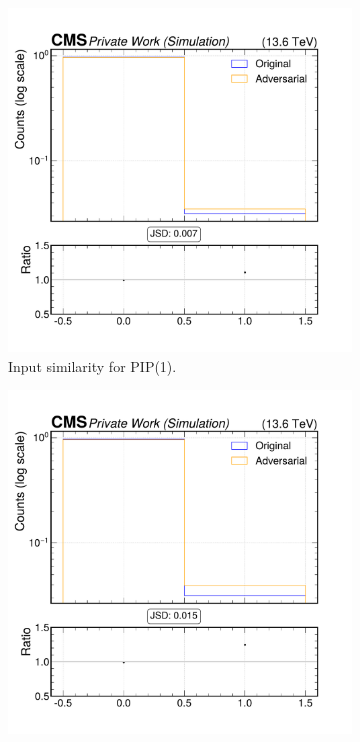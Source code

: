 \begin{figure}[h]
  \centering
  \begin{subfigure}[t]{0.32\textwidth}
    \includegraphics[width=\linewidth]{media/output/features/compare/intprob_1/cmp_npf_arr_Npfcan_HadFrac.pdf}
    \caption{Input similarity for PIP(1).}
  \end{subfigure}\hfill
  \begin{subfigure}[t]{0.32\textwidth}
    \includegraphics[width=\linewidth]{media/output/features/compare/intprob_2/cmp_npf_arr_Npfcan_HadFrac.pdf}

\end{subfigure}
\end{figure}
